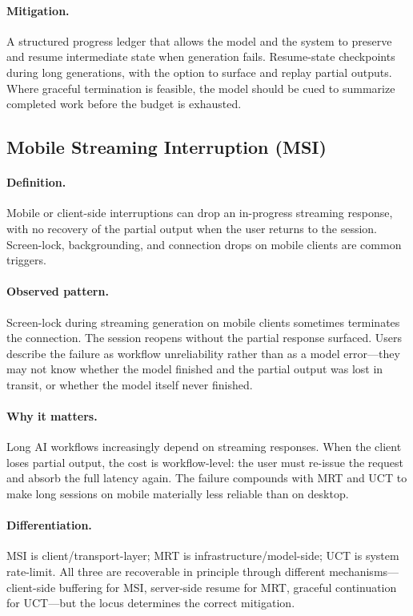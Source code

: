 \documentclass[11pt]{article}
\begin{document}
\paragraph{Mitigation.} A structured progress ledger that allows the model and the system to preserve and resume intermediate state when generation fails. Resume-state checkpoints during long generations, with the option to surface and replay partial outputs. Where graceful termination is feasible, the model should be cued to summarize completed work before the budget is exhausted.

\subsection{Mobile Streaming Interruption (MSI)}
\paragraph{Definition.} Mobile or client-side interruptions can drop an in-progress streaming response, with no recovery of the partial output when the user returns to the session. Screen-lock, backgrounding, and connection drops on mobile clients are common triggers.

\paragraph{Observed pattern.} Screen-lock during streaming generation on mobile clients sometimes terminates the connection. The session reopens without the partial response surfaced. Users describe the failure as workflow unreliability rather than as a model error---they may not know whether the model finished and the partial output was lost in transit, or whether the model itself never finished.

\paragraph{Why it matters.} Long AI workflows increasingly depend on streaming responses. When the client loses partial output, the cost is workflow-level: the user must re-issue the request and absorb the full latency again. The failure compounds with MRT and UCT to make long sessions on mobile materially less reliable than on desktop.

\paragraph{Differentiation.} MSI is client/transport-layer; MRT is infrastructure/model-side; UCT is system rate-limit. All three are recoverable in principle through different mechanisms---client-side buffering for MSI, server-side resume for MRT, graceful continuation for UCT---but the locus determines the correct mitigation.
\end{document}
